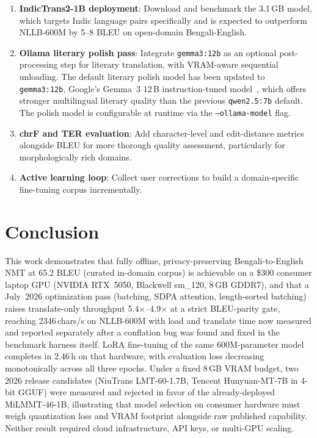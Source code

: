 \documentclass[conference]{IEEEtran}
\newcommand{\TRAINDURATION}{2.46\,h}
\newcommand{\NLLBCHS}{2346}
\newcommand{\NLLBSPEEDUP}{5.4$\times$}
\newcommand{\MILMMTSPEEDUP}{4.9$\times$}
\begin{document}
\begin{enumerate}
  \item \textbf{IndicTrans2-1B deployment}: Download and benchmark the 3.1\,GB model,
        which targets Indic language pairs specifically and is expected to
        outperform NLLB-600M by 5--8 BLEU on open-domain Bengali-English.

  \item \textbf{Ollama literary polish pass}: Integrate \texttt{gemma3:12b} as an
        optional post-processing step for literary translation, with VRAM-aware
        sequential unloading.
        The default literary polish model has been updated to \texttt{gemma3:12b},
        Google's Gemma~3 12\,B instruction-tuned model~\cite{gemma2025}, which offers
        stronger multilingual literary quality than the previous \texttt{qwen2.5:7b} default.
        The polish model is configurable at runtime via the \texttt{--ollama-model} flag.

  \item \textbf{chrF and TER evaluation}: Add character-level and edit-distance
        metrics alongside BLEU for more thorough quality assessment,
        particularly for morphologically rich domains.

  \item \textbf{Active learning loop}: Collect user corrections to build a
        domain-specific fine-tuning corpus incrementally.
\end{enumerate}

\section{Conclusion}

This work demonstrates that fully offline, privacy-preserving Bengali-to-English NMT
at 65.2 BLEU (curated in-domain corpus) is achievable on a \$300 consumer laptop GPU
(NVIDIA RTX~5050, Blackwell sm\_120, 8\,GB GDDR7), and that a July~2026 optimization
pass (batching, SDPA attention, length-sorted batching) raises translate-only
throughput \NLLBSPEEDUP{}--\MILMMTSPEEDUP{} at a strict BLEU-parity gate, reaching
\NLLBCHS{}\,chars/s on NLLB-600M with load and translate time now measured and
reported separately after a conflation bug was found and fixed in the benchmark
harness itself.
LoRA fine-tuning of the same 600M-parameter model completes in \TRAINDURATION{} on
that hardware, with evaluation loss decreasing monotonically across all three epochs.
Under a fixed 8\,GB VRAM budget, two 2026 release candidates (NiuTrans LMT-60-1.7B,
Tencent Hunyuan-MT-7B in 4-bit GGUF) were measured and rejected in favor of the
already-deployed MiLMMT-46-1B, illustrating that model selection on consumer
hardware must weigh quantization loss and VRAM footprint alongside raw published
capability. Neither result required cloud infrastructure, API keys, or multi-GPU scaling.
\end{document}
